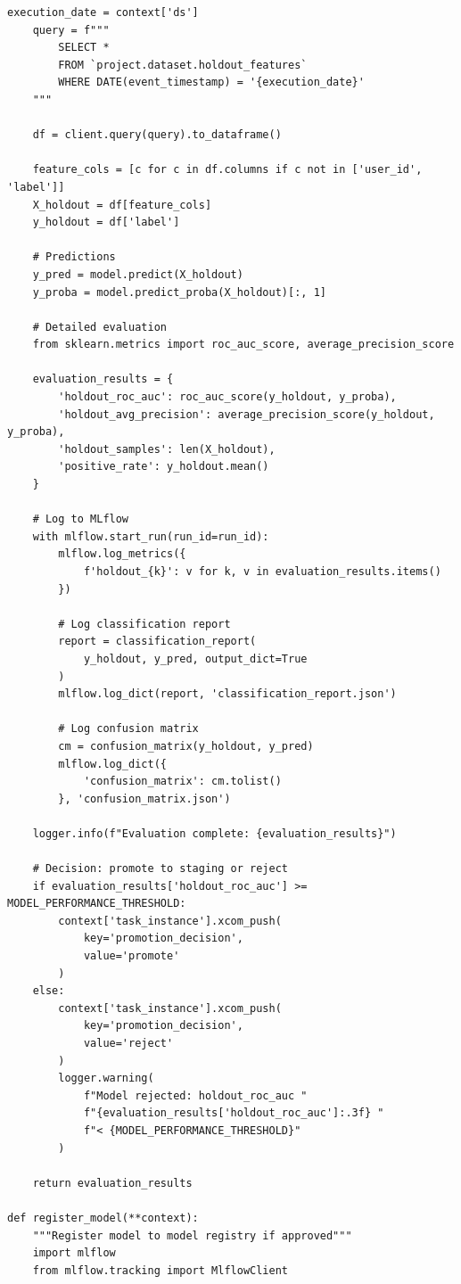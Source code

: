 \begin{lstlisting}[style=python, caption=Production ML Training Pipeline with Airflow]
    execution_date = context['ds']
    query = f"""
        SELECT *
        FROM `project.dataset.holdout_features`
        WHERE DATE(event_timestamp) = '{execution_date}'
    """

    df = client.query(query).to_dataframe()

    feature_cols = [c for c in df.columns if c not in ['user_id', 'label']]
    X_holdout = df[feature_cols]
    y_holdout = df['label']

    # Predictions
    y_pred = model.predict(X_holdout)
    y_proba = model.predict_proba(X_holdout)[:, 1]

    # Detailed evaluation
    from sklearn.metrics import roc_auc_score, average_precision_score

    evaluation_results = {
        'holdout_roc_auc': roc_auc_score(y_holdout, y_proba),
        'holdout_avg_precision': average_precision_score(y_holdout, y_proba),
        'holdout_samples': len(X_holdout),
        'positive_rate': y_holdout.mean()
    }

    # Log to MLflow
    with mlflow.start_run(run_id=run_id):
        mlflow.log_metrics({
            f'holdout_{k}': v for k, v in evaluation_results.items()
        })

        # Log classification report
        report = classification_report(
            y_holdout, y_pred, output_dict=True
        )
        mlflow.log_dict(report, 'classification_report.json')

        # Log confusion matrix
        cm = confusion_matrix(y_holdout, y_pred)
        mlflow.log_dict({
            'confusion_matrix': cm.tolist()
        }, 'confusion_matrix.json')

    logger.info(f"Evaluation complete: {evaluation_results}")

    # Decision: promote to staging or reject
    if evaluation_results['holdout_roc_auc'] >= MODEL_PERFORMANCE_THRESHOLD:
        context['task_instance'].xcom_push(
            key='promotion_decision',
            value='promote'
        )
    else:
        context['task_instance'].xcom_push(
            key='promotion_decision',
            value='reject'
        )
        logger.warning(
            f"Model rejected: holdout_roc_auc "
            f"{evaluation_results['holdout_roc_auc']:.3f} "
            f"< {MODEL_PERFORMANCE_THRESHOLD}"
        )

    return evaluation_results

def register_model(**context):
    """Register model to model registry if approved"""
    import mlflow
    from mlflow.tracking import MlflowClient


\end{lstlisting}
